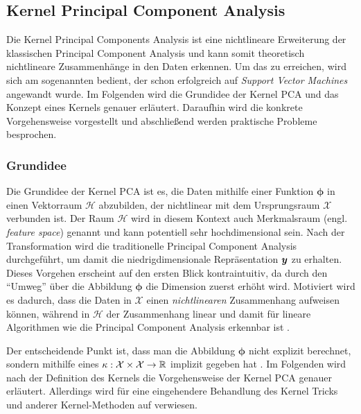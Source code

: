 \subsection{Kernel Principal Component Analysis}
\label{ch:MethodenDerDimRed:statistisch:kPCA}
Die Kernel Principal Components Analysis \parencite{Scholkopf.1997} ist eine nichtlineare Erweiterung der klassischen Principal Component
Analysis und kann somit theoretisch nichtlineare Zusammenhänge in den Daten erkennen. Um das zu
erreichen, wird sich am sogenannten  bedient, der schon erfolgreich auf
\textit{Support Vector Machines} \parencite{Boser.1992} angewandt wurde. Im Folgenden wird die Grundidee der Kernel PCA und das Konzept
eines Kernels genauer erläutert. Daraufhin wird die konkrete Vorgehensweise vorgestellt und
abschließend werden praktische Probleme besprochen.

\subsubsection{Grundidee}
\label{ch:MethodenDerDimRed:statistisch:kPCA:Grundidee}

Die Grundidee der Kernel PCA ist es, die Daten mithilfe einer Funktion $\bm{\phi}$ in einen
Vektorraum $\mathcal{H}$ abzubilden, der nichtlinear mit dem Ursprungsraum $\mathcal{X}$ verbunden
ist. Der Raum $\mathcal{H}$ wird in diesem Kontext auch Merkmalsraum (engl. \textit{feature space})
genannt und kann potentiell sehr hochdimensional sein. Nach der Transformation wird die
traditionelle Principal Component Analysis durchgeführt, um damit die niedrigdimensionale
Repräsentation $\bm{y}$ zu erhalten. Dieses Vorgehen erscheint auf den ersten Blick
kontraintuitiv, da durch den \enquote{Umweg} über die Abbildung $\bm{\phi}$ die Dimension zuerst
erhöht wird. Motiviert wird es dadurch, dass die Daten in $\mathcal{X}$ einen
\textit{nichtlinearen} Zusammenhang aufweisen können, während in $\mathcal{H}$ der Zusammenhang
linear und damit für lineare Algorithmen wie die Principal Component Analysis erkennbar ist \parencite[vgl.][26]{ShaweTaylor.2011}.

Der entscheidende Punkt ist, dass man die Abbildung $\bm{\phi}$ nicht explizit berechnet, sondern
mithilfe eines  $\kappa: \mathcal{X} \times \mathcal{X} \rightarrow \mathbb{R}$
implizit gegeben hat \parencites[586 -- 588]{Bishop.2006}[583]{Scholkopf.1997}. Im Folgenden wird nach der Definition des
Kernels die Vorgehensweise der Kernel PCA genauer erläutert. Allerdings wird für eine eingehendere
Behandlung des Kernel Tricks und anderer Kernel-Methoden auf \textcite{ShaweTaylor.2011} verwiesen.

